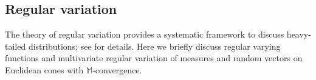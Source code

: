 \documentclass[aos]{imsart}
\numberwithin{equation}{section}
\theoremstyle{plain} %
\theoremstyle{remark}
\newcommand{\C}{\mathbb{C}}
\newcommand{\E}{\mathbb{E}}
\newcommand{\M}{\mathbb{M}}
\newcommand{\R}{\mathbb{R}}
\newcommand{\VF}[1]{{\color{blue} #1}}
\def\gpolar{\text{GPOLAR}}
\def\axes{\text{axes}}
\def\MRV{\mathcal{MRV}}
\def\HRV{\mathcal{HRV}}
\def\binfty{\boldsymbol \infty}
\def\bzero{\boldsymbol 0}
\def\bX{\boldsymbol X}
\def\bY{\boldsymbol Y}
\def\bx{\boldsymbol x}
\def\by{\boldsymbol y}
\def\ba{\boldsymbol a}
\begin{document}

\subsection{Regular variation} \label{subsec:regvar}
The theory of regular variation provides a systematic framework to discuss heavy-tailed distributions; see \citet{bingham:goldie:teugels:1989,resnickbook:2007} for details. Here we briefly discuss regular varying functions and multivariate regular variation of measures and random vectors on Euclidean cones with $\M$-convergence.
\end{document}
